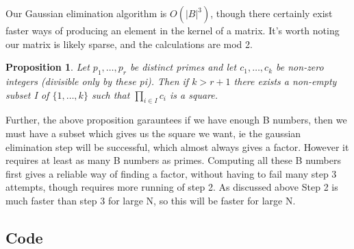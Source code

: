 \documentclass[10pt,a4paper]{report}
\newtheorem*{prop}{Proposition}
\begin{document}
Our Gaussian elimination algorithm is $O(|B|^3)$, though there certainly exist faster ways of producing an element in the kernel of a matrix. It's worth noting our matrix is likely sparse, and the calculations are mod 2.\\ 

\begin{prop}
Let $p_1,\dots, p_r$ be distinct primes and let $c_1, \dots, c_k$ be non-zero integers (divisible only by these pi). Then if $k > r + 1$ there exists a non-empty subset I of $\{1,\dots, k\}$ such that $\prod_{i\in I} c_i$ is a square.
\end{prop}

Further, the above proposition garauntees if we have enough B numbers, then we must have a subset which gives us the square we want, ie the gaussian elimination step will be successful, which almost always gives a factor. However it requires at least as many B numbers as primes. Computing all these B numbers first  gives a reliable way of finding a factor, without having to fail many step 3 attempts, though requires more running of step 2. As discussed above Step 2 is much faster than step 3 for large N, so this will be faster for large N.

\newpage

\subsection*{Code}
\end{document}
